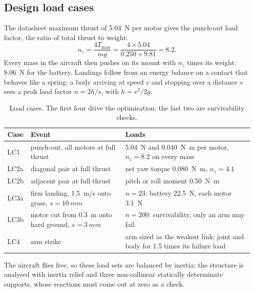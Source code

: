\subsection{Design load cases}

The datasheet maximum thrust of \SI{5.04}{\newton} per motor gives the punch-out load factor, the ratio of total thrust to weight:
\begin{equation}
n_z = \frac{4 T_\text{max}}{m g} = \frac{4 \times 5.04}{0.250 \times 9.81} = 8.2.
\end{equation}
Every mass in the aircraft then pushes on its mount with $n_z$ times its weight: \SI{8.06}{\newton} for the battery. Landings follow from an energy balance on a contact that behaves like a spring: a body arriving at speed $v$ and stopping over a distance $s$ sees a peak load factor $n = 2h/s$, with $h = v^2/2g$.

\begin{table}[htbp]
\centering\small
\caption{Load cases. The first four drive the optimisation; the last two are survivability checks.}\label{tab:loadcases}
\begin{tabularx}{\linewidth}{@{}llX@{}}
\toprule
Case & Event & Loads\\
\midrule
LC1 & punch-out, all motors at full thrust & \SI{5.04}{\newton} and \SI{0.040}{\newton\metre} per motor, $n_z = 8.2$ on every mass\\
LC2a & diagonal pair at full thrust & net yaw torque \SI{0.080}{\newton\metre}, $n_z = 4.1$\\
LC2b & adjacent pair at full thrust & pitch or roll moment \SI{0.50}{\newton\metre}\\
LC3a & firm landing, \SI{1.5}{m/s} onto grass, $s = \SI{10}{mm}$ & $n = 23$: battery \SI{22.5}{\newton}, each motor \SI{3.1}{\newton}\\
LC3b & motor cut from \SI{0.3}{m} onto hard ground, $s = \SI{3}{mm}$ & $n = 200$: survivability, only an arm may fail\\
LC4 & arm strike & arm sized as the weakest link; joint and body for 1.5 times its failure load\\
\bottomrule
\end{tabularx}
\end{table}

The aircraft flies free, so these load sets are balanced by inertia: the structure is analysed with inertia relief and three non-collinear statically determinate supports, whose reactions must come out at zero as a check.
